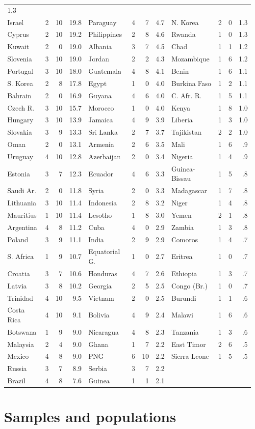 \documentclass[11pt,a4paper,openany]{book}
\begin{document}
\begin{longtable}[]{@{}lrrrlrrrlrrr@{}}
1.3\tabularnewline
Israel & 2 & 10 & 19.8 & Paraguay & 4 & 7 & 4.7 & N. Korea & 2 & 0 &
1.3\tabularnewline
Cyprus & 2 & 10 & 19.2 & Philippines & 2 & 8 & 4.6 & Rwanda & 1 & 0 &
1.3\tabularnewline
Kuwait & 2 & 0 & 19.0 & Albania & 3 & 7 & 4.5 & Chad & 1 & 1 &
1.2\tabularnewline
Slovenia & 3 & 10 & 19.0 & Jordan & 2 & 2 & 4.3 & Mozambique & 1 & 6 &
1.2\tabularnewline
Portugal & 3 & 10 & 18.0 & Guatemala & 4 & 8 & 4.1 & Benin & 1 & 6 &
1.1\tabularnewline
S. Korea & 2 & 8 & 17.8 & Egypt & 1 & 0 & 4.0 & Burkina Faso & 1 & 2 &
1.1\tabularnewline
Bahrain & 2 & 0 & 16.9 & Guyana & 4 & 6 & 4.0 & C. Afr. R. & 1 & 5 &
1.1\tabularnewline
Czech R. & 3 & 10 & 15.7 & Morocco & 1 & 0 & 4.0 & Kenya & 1 & 8 &
1.0\tabularnewline
Hungary & 3 & 10 & 13.9 & Jamaica & 4 & 9 & 3.9 & Liberia & 1 & 3 &
1.0\tabularnewline
Slovakia & 3 & 9 & 13.3 & Sri Lanka & 2 & 7 & 3.7 & Tajikistan & 2 & 2 &
1.0\tabularnewline
Oman & 2 & 0 & 13.1 & Armenia & 2 & 6 & 3.5 & Mali & 1 & 6 &
.9\tabularnewline
Uruguay & 4 & 10 & 12.8 & Azerbaijan & 2 & 0 & 3.4 & Nigeria & 1 & 4 &
.9\tabularnewline
Estonia & 3 & 7 & 12.3 & Ecuador & 4 & 6 & 3.3 & Guinea-Bissau & 1 & 5 &
.8\tabularnewline
Saudi Ar. & 2 & 0 & 11.8 & Syria & 2 & 0 & 3.3 & Madagascar & 1 & 7 &
.8\tabularnewline
Lithuania & 3 & 10 & 11.4 & Indonesia & 2 & 8 & 3.2 & Niger & 1 & 4 &
.8\tabularnewline
Mauritius & 1 & 10 & 11.4 & Lesotho & 1 & 8 & 3.0 & Yemen & 2 & 1 &
.8\tabularnewline
Argentina & 4 & 8 & 11.2 & Cuba & 4 & 0 & 2.9 & Zambia & 1 & 3 &
.8\tabularnewline
Poland & 3 & 9 & 11.1 & India & 2 & 9 & 2.9 & Comoros & 1 & 4 &
.7\tabularnewline
S. Africa & 1 & 9 & 10.7 & Equatorial G. & 1 & 0 & 2.7 & Eritrea & 1 & 0
& .7\tabularnewline
Croatia & 3 & 7 & 10.6 & Honduras & 4 & 7 & 2.6 & Ethiopia & 1 & 3 &
.7\tabularnewline
Latvia & 3 & 8 & 10.2 & Georgia & 2 & 5 & 2.5 & Congo (Br.) & 1 & 0 &
.7\tabularnewline
Trinidad & 4 & 10 & 9.5 & Vietnam & 2 & 0 & 2.5 & Burundi & 1 & 1 &
.6\tabularnewline
Costa Rica & 4 & 10 & 9.1 & Bolivia & 4 & 9 & 2.4 & Malawi & 1 & 6 &
.6\tabularnewline
Botswana & 1 & 9 & 9.0 & Nicaragua & 4 & 8 & 2.3 & Tanzania & 1 & 3 &
.6\tabularnewline
Malaysia & 2 & 4 & 9.0 & Ghana & 1 & 7 & 2.2 & East Timor & 2 & 6 &
.5\tabularnewline
Mexico & 4 & 8 & 9.0 & PNG & 6 & 10 & 2.2 & Sierra Leone & 1 & 5 &
.5\tabularnewline
Russia & 3 & 7 & 8.9 & Serbia & 3 & 7 & 2.2 & & & &\tabularnewline
Brazil & 4 & 8 & 7.6 & Guinea & 1 & 1 & 2.1 & & & &\tabularnewline
\bottomrule
\end{longtable}

\chapter{Samples and populations}\label{c-samples}
\end{document}
